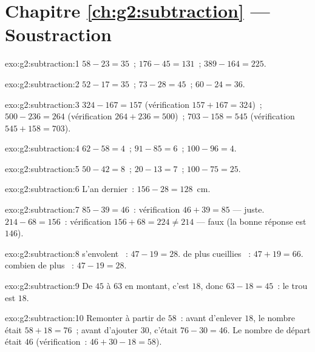 \section*{Chapitre \ref{ch:g2:subtraction} --- Soustraction}

\begin{solution}{exo:g2:subtraction:1}
$58 - 23 = 35$~; \quad $176 - 45 = 131$~; \quad $389 - 164 = 225$.
\end{solution}

\begin{solution}{exo:g2:subtraction:2}
$52 - 17 = 35$~; \quad $73 - 28 = 45$~; \quad $60 - 24 = 36$.
\end{solution}

\begin{solution}{exo:g2:subtraction:3}
$324 - 167 = 157$ (vérification $157 + 167 = 324$)~; \quad
$500 - 236 = 264$ (vérification $264 + 236 = 500$)~; \quad
$703 - 158 = 545$ (vérification $545 + 158 = 703$).
\end{solution}

\begin{solution}{exo:g2:subtraction:4}
$62 - 58 = 4$~; \quad $91 - 85 = 6$~; \quad $100 - 96 = 4$.
\end{solution}

\begin{solution}{exo:g2:subtraction:5}
$50 - 42 = 8$~; \quad $20 - 13 = 7$~; \quad $100 - 75 = 25$.
\end{solution}

\begin{solution}{exo:g2:subtraction:6}
L'an dernier~: $156 - 28 = 128$~cm.
\end{solution}

\begin{solution}{exo:g2:subtraction:7}
$85 - 39 = 46$~: vérification $46 + 39 = 85$ --- juste.
$214 - 68 = 156$~: vérification $156 + 68 = 224 \neq 214$ --- faux
(la bonne réponse est $146$).
\end{solution}

\begin{solution}{exo:g2:subtraction:8}
\guillemotleft{} s'envolent \guillemotright{}~: $47 - 19 = 28$.
\guillemotleft{} de plus cueillies \guillemotright{}~:
$47 + 19 = 66$. \guillemotleft{} combien de plus
\guillemotright{}~: $47 - 19 = 28$.
\end{solution}

\begin{solution}{exo:g2:subtraction:9}
De $45$ à $63$ en montant, c'est $18$, donc $63 - 18 = 45$~: le
trou est $18$.
\end{solution}

\begin{solution}{exo:g2:subtraction:10}
Remonter à partir de $58$~: avant d'enlever $18$, le nombre était
$58 + 18 = 76$~; avant d'ajouter $30$, c'était $76 - 30 = 46$. Le
nombre de départ était $46$ (vérification~:
$46 + 30 - 18 = 58$).
\end{solution}
